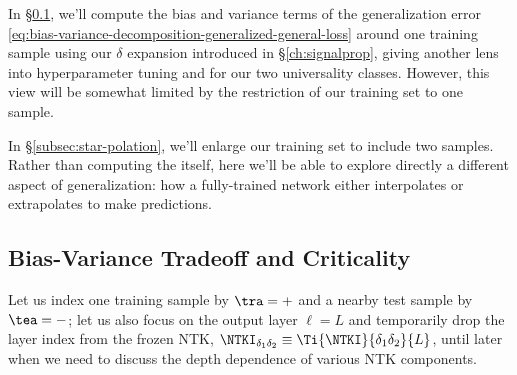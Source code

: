 In \S\ref{subsec:robustness-from-infinite-GD}, we'll compute the bias and variance terms of the generalization error \eqref{eq:bias-variance-decomposition-generalized-general-loss} around one training sample using our $\delta$ expansion introduced in \S\ref{ch:signalprop}, giving another lens into hyperparameter tuning and  for our two universality classes. However, this view will be somewhat limited by the restriction of our training set to one sample.

In \S\ref{subsec:star-polation}, we'll enlarge our training set to include two samples. Rather than computing the  itself, here we'll be able to explore directly 
a different aspect of generalization: how a fully-trained network either interpolates or extrapolates to make predictions. %


\subsection{Bias-Variance Tradeoff and Criticality}\label{subsec:robustness-from-infinite-GD}
Let us index one training sample by $\tra=+$ and a nearby test sample by $\tea=-$; let us also focus on the output layer $\ell=L$ and temporarily drop the layer index from the frozen NTK, $\NTKI_{\delta_1\delta_2}\equiv\Ti{\NTKI}{\delta_1\delta_2}{L}$, until later when we need to discuss the depth dependence of various NTK components.


